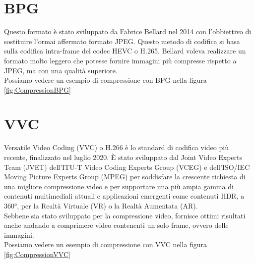 \section{BPG}
Questo formato è stato sviluppato da Fabrice Bellard nel 2014 con l'obbiettivo di sostituire l’ormai affermato formato JPEG. Questo metodo di codifica si basa sulla codifica intra-frame del codec HEVC o H.265. \cite{BPGImageformat} Bellard voleva realizzare un formato molto leggero che potesse fornire immagini più compresse rispetto a JPEG, ma con una qualità superiore.\\
Possiamo vedere un esempio di compressione con BPG nella figura \ref{fig:CompressionBPG}

\section{VVC}
Versatile Video Coding (VVC) o H.266 è lo standard di codifica video più recente, finalizzato nel luglio 2020. È stato sviluppato dal Joint Video Experts Team (JVET) dell'ITU-T Video Coding Experts Group (VCEG) e dell'ISO/IEC Moving Picture Experts Group (MPEG) per soddisfare la crescente richiesta di una migliore compressione video e per supportare una più ampia gamma di contenuti multimediali attuali e applicazioni emergenti come contenuti HDR, a 360°, per la Realtà Virtuale (VR) o la Realtà Aumentata (AR).\cite{9503377}\\
Sebbene sia stato sviluppato per la compressione video, fornisce ottimi risultati anche andando a comprimere video contenenti un solo frame, ovvero delle immagini.\\
Possiamo vedere un esempio di compressione con VVC nella figura \ref{fig:CompressionVVC}

